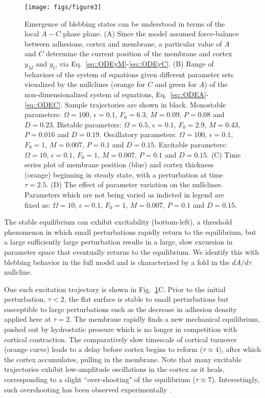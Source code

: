 \begin{figure}
   \begin{center}
   \captionsetup{width=17cm}
     \texttt{[image: figs/figure3]}
      \caption{Emergence of blebbing states can be understood in terms of the local $A-C$ phase plane. (A) Since the model assumed force-balance between adhesions, cortex and membrane, a particular value of $A$ and $C$ determine the current position of the membrane and cortex $y_M$ and $y_C$ via Eq.~\ref{eq::ODEyM}-\ref{eq::ODEyC}. (B) Range of behaviors of the system of equations given different parameter sets visualized by the nullclines (orange for $C$ and green for $A$) of the non-dimensionalized  system of equations, Eq.~\ref{eq::ODEA}-\ref{eq::ODEC}. Sample trajectories are shown in black. Monostable parameters:  $\Omega = 100$, $\epsilon = 0.1$, $F_0 = 6.3$, $M = 0.09$, $P = 0.08$ and $D = 0.23$. Bistable parameters:  $\Omega = 6.5$, $\epsilon = 0.1$, $F_0 = 2.9$, $M = 0.43$, $P = 0.016$ and $D = 0.19$. Oscillatory parameters:  $\Omega = 100$, $\epsilon = 0.1$, $F_0 = 1$, $M = 0.007$, $P = 0.1$ and $D = 0.15$. Excitable parameters:  $\Omega = 10$, $\epsilon = 0.1$, $F_0 = 1$, $M = 0.007$, $P = 0.1$ and $D = 0.15$. (C) Time series plot of membrane position (blue) and cortex thickness (orange) beginning in steady state, with a perturbation at time $\tau = 2.5$. (D) The effect of parameter variation on the nullclines. Parameters which are not being varied as indicted in legend are fixed as: $\Omega = 10$, $\epsilon = 0.1$, $F_0 = 1$, $M = 0.007$, $P = 0.1$ and $D = 0.15$. }
      \label{fig::ODE}
   \end{center}
\end{figure}


The stable equilibrium can exhibit excitability (bottom-left), a threshold phenomenon in which small perturbations rapidly return to the equilibrium, but a large sufficiently large perturbation results in a large, slow excursion in parameter space that eventually returns to the equilibrium. We identify this with blebbing behavior in the full model and is characterized by a fold in the $dA/d\tau$ nullcline. 

One such excitation trajectory is shown in Fig.~\ref{fig::ODE}C. 
Prior to the initial perturbation, $\tau<2$, the flat surface is stable to small perturbations but susceptible to large perturbations such as the decrease in adhesion density applied here at $\tau=2$. The membrane rapidly finds a new mechanical equilibrium, pushed out by hydrostatic pressure which is no longer in competition with cortical contraction. The comparatively slow timescale of cortical turnover (orange curve) leads to a delay before cortex begins to reform ($\tau\approx 4)$, after which the cortex accumulates, pulling in the membrane. Note that many excitable trajectories exhibit low-amplitude oscillations in the cortex as it heals, corresponding to a slight ``over-shooting" of the equilibrium ($\tau\approx 7$). Interestingly, such overshooting has been observed experimentally \cite{Clark:2013ef}.


